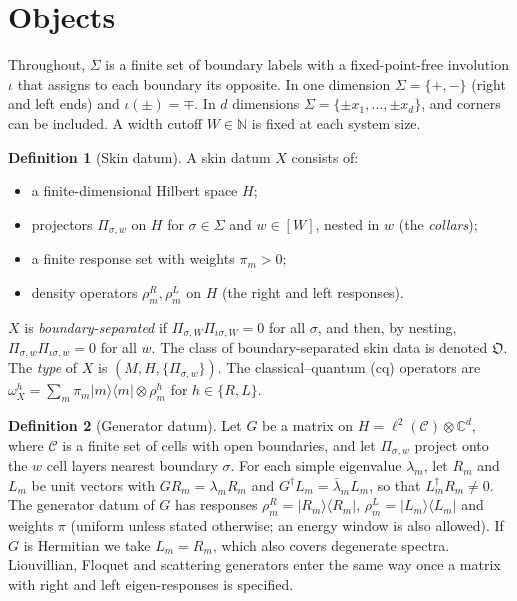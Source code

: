 \documentclass[11pt]{article}
\theoremstyle{definition}
\newtheorem{definition}{Definition}
\theoremstyle{remark}
\newcommand{\proj}[1]{|#1\rangle\!\langle #1|}
\newcommand{\Obj}{\mathfrak{O}}
\newcommand{\isig}{\iota\sigma}
\begin{document}
\section{Objects}
\label{sec:objects}

Throughout, $\Sigma$ is a finite set of boundary labels with a fixed-point-free involution $\iota$ that assigns to each boundary its opposite. In one dimension $\Sigma=\{+,-\}$ (right and left ends) and $\iota(\pm)=\mp$. In $d$ dimensions $\Sigma=\{\pm x_1,\dots,\pm x_d\}$, and corners can be included. A width cutoff $W\in\mathbb N$ is fixed at each system size.

\begin{definition}[Skin datum]\label{def:object}
A skin datum $X$ consists of:
\begin{itemize}
\item a finite-dimensional Hilbert space $H$;
\item projectors $\Pi_{\sigma,w}$ on $H$ for $\sigma\in\Sigma$ and $w\in[W]$, nested in $w$ (the \emph{collars});
\item a finite response set with weights $\pi_m>0$;
\item density operators $\rho^R_m,\rho^L_m$ on $H$ (the right and left responses).
\end{itemize}
$X$ is \emph{boundary-separated} if $\Pi_{\sigma,W}\Pi_{\isig,W}=0$ for all $\sigma$, and then, by nesting, $\Pi_{\sigma,w}\Pi_{\isig,w}=0$ for all $w$. The class of boundary-separated skin data is denoted $\Obj$. The \emph{type} of $X$ is $(M,H,\{\Pi_{\sigma,w}\})$. The classical--quantum (cq) operators are $\omega^h_X=\sum_m\pi_m\proj m\otimes\rho^h_m$ for $h\in\{R,L\}$.
\end{definition}

\begin{definition}[Generator datum]\label{def:generator}
Let $G$ be a matrix on $H=\ell^2(\mathcal C)\otimes\mathbb C^{d}$, where $\mathcal C$ is a finite set of cells with open boundaries, and let $\Pi_{\sigma,w}$ project onto the $w$ cell layers nearest boundary $\sigma$. For each simple eigenvalue $\lambda_m$, let $R_m$ and $L_m$ be unit vectors with $GR_m=\lambda_mR_m$ and $G^\dagger L_m=\bar\lambda_mL_m$, so that $L_m^\dagger R_m\neq0$. The generator datum of $G$ has responses $\rho^R_m=\proj{R_m}$, $\rho^L_m=\proj{L_m}$ and weights $\pi$ (uniform unless stated otherwise; an energy window is also allowed). If $G$ is Hermitian we take $L_m=R_m$, which also covers degenerate spectra. Liouvillian, Floquet and scattering generators enter the same way once a matrix with right and left eigen-responses is specified.
\end{definition}
\end{document}
